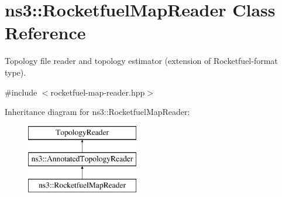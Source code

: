\hypertarget{classns3_1_1RocketfuelMapReader}{}\section{ns3\+:\+:Rocketfuel\+Map\+Reader Class Reference}
\label{classns3_1_1RocketfuelMapReader}


Topology file reader and topology estimator (extension of Rocketfuel-\/format type).  




{\ttfamily \#include $<$rocketfuel-\/map-\/reader.\+hpp$>$}

Inheritance diagram for ns3\+:\+:Rocketfuel\+Map\+Reader\+:\begin{figure}[H]
\begin{center}
\leavevmode
\includegraphics[height=3.000000cm]{classns3_1_1RocketfuelMapReader}
\end{center}
\end{figure}
